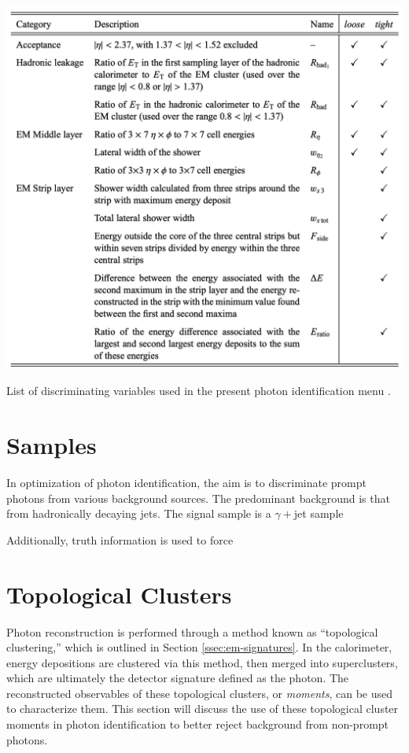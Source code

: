 \begin{table}[!thp]
    \centering
    \includegraphics[width=.90\textwidth]{chapters/chapter4_photonID/images/ss-table.png}
    \caption[List of discriminating variables used in the present photon identification menu.]
    {List of discriminating variables used in the present photon identification menu \cite{r1-photonID}.}
    \label{tab:ss-vars-table}
\end{table}

\section{Samples} \label{sec:photon-id-samples}

In optimization of photon identification, the aim is to discriminate prompt photons from various background sources. The predominant background is that from hadronically decaying jets. The signal sample is a $\gamma+$jet sample

Additionally, truth information is used to force 


\section{Topological Clusters}

Photon reconstruction is performed through a method known as ``topological clustering,'' which is outlined in Section \ref{ssec:em-signatures}. In the calorimeter, energy depositions are clustered via this method, then merged into superclusters, which are ultimately the detector signature defined as the photon. The reconstructed observables of these topological clusters, or \textit{moments}, can be used to characterize them. This section will discuss the use of these topological cluster moments in photon identification to better reject background from non-prompt photons.

